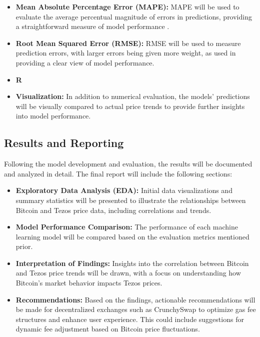 \begin{itemize}
    \item \textbf{Mean Absolute Percentage Error (MAPE):} MAPE will be used to evaluate the average percentual magnitude of errors in predictions, providing a straightforward measure of model performance \textcite{dennys2019predicting}.
    \item \textbf{Root Mean Squared Error (RMSE):} RMSE will be used to measure prediction errors, with larger errors being given more weight, as used in \textcite{mishal2022prediction} providing a clear view of model performance.
    \item \textbf{R}
    \item \textbf{Visualization:} In addition to numerical evaluation, the models’ predictions will be visually compared to actual price trends to provide further insights into model performance.
\end{itemize}

\subsection{Results and Reporting}
Following the model development and evaluation, the results will be documented and analyzed in detail. The final report will include the following sections:

\begin{itemize}
    \item \textbf{Exploratory Data Analysis (EDA):} Initial data visualizations and summary statistics will be presented to illustrate the relationships between Bitcoin and Tezos price data, including correlations and trends.
    \item \textbf{Model Performance Comparison:} The performance of each machine learning model will be compared based on the evaluation metrics mentioned prior.
    \item \textbf{Interpretation of Findings:} Insights into the correlation between Bitcoin and Tezos price trends will be drawn, with a focus on understanding how Bitcoin’s market behavior impacts Tezos prices.
    \item \textbf{Recommendations:} Based on the findings, actionable recommendations will be made for decentralized exchanges such as CrunchySwap to optimize gas fee structures and enhance user experience. This could include suggestions for dynamic fee adjustment based on Bitcoin price fluctuations.
\end{itemize}

